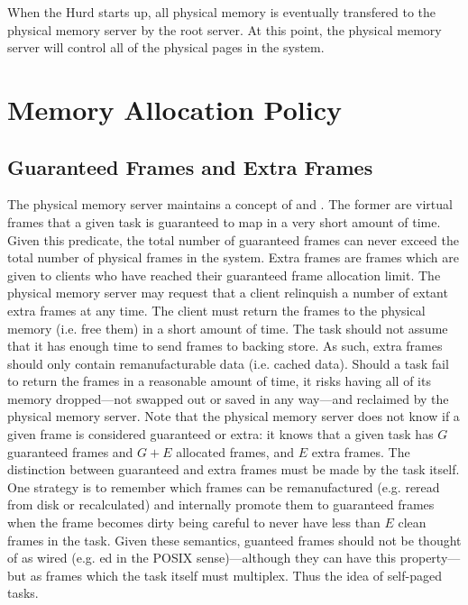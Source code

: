 When the Hurd starts up, all physical memory is eventually transfered
to the physical memory server by the root server.  At this point, the
physical memory server will control all of the physical pages in the
system.

\section{Memory Allocation Policy}

\subsection{Guaranteed Frames and Extra Frames}

The physical memory server maintains a concept of  and .  The former are virtual frames
that a given task is guaranteed to map in a very short amount of time.
Given this predicate, the total number of guaranteed frames can never
exceed the total number of physical frames in the system.  Extra
frames are frames which are given to clients who have reached their
guaranteed frame allocation limit.  The physical memory server may
request that a client relinquish a number of extant extra frames at
any time.  The client must return the frames to the physical memory
(i.e. free them) in a short amount of time.  The task should not
assume that it has enough time to send frames to backing store.  As
such, extra frames should only contain remanufacturable data
(i.e. cached data).  Should a task fail to return the frames in a
reasonable amount of time, it risks having all of its memory
dropped---not swapped out or saved in any way---and reclaimed by the
physical memory server.  Note that the physical memory server does not
know if a given frame is considered guaranteed or extra: it knows that
a given task has $G$ guaranteed frames and $G + E$ allocated frames,
and $E$ extra frames.  The distinction between guaranteed and extra
frames must be made by the task itself.  One strategy is to remember
which frames can be remanufactured (e.g. reread from disk or
recalculated) and internally promote them to guaranteed frames when
the frame becomes dirty being careful to never have less than $E$
clean frames in the task.  Given these semantics, guanteed frames
should not be thought of as wired (e.g. ed in the
POSIX sense)---although they can have this property---but as frames
which the task itself must multiplex.  Thus the idea of self-paged
tasks.

